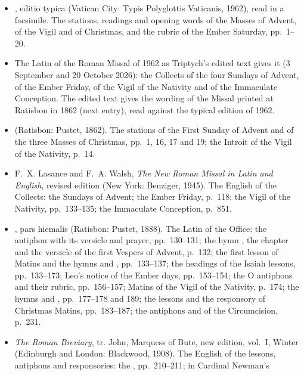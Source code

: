 \begin{itemize}[leftmargin=1.3em, itemsep=0.3em]
\item {}, editio typica (Vatican City: Typis Polyglottis Vaticanis, 1962),
read in a facsimile. The stations, readings and opening words of the Masses of Advent, of the
Vigil and of Christmas, and the rubric of the Ember Saturday, pp.~1--20.
\item The Latin of the Roman Missal of 1962 as Triptych's edited text gives it (3 September and
20 October 2026): the Collects of the four Sundays of Advent, of the Ember Friday, of the Vigil of
the Nativity and of the Immaculate Conception. The edited text gives the wording of the Missal
printed at Ratisbon in 1862 (next entry), read against the typical edition of 1962.
\item {} (Ratisbon: Pustet, 1862). The stations of the First Sunday of
Advent and of the three Masses of Christmas, pp.~1, 16, 17 and 19; the Introit of the Vigil of the
Nativity, p.~14.
\item F.~X. Lasance and F.~A. Walsh, \textit{The New Roman Missal in Latin and English}, revised
edition (New York: Benziger, 1945). The English of the Collects: the Sundays of Advent; the Ember
Friday, p.~118; the Vigil of the Nativity, pp.~133--135; the Immaculate Conception, p.~851.
\item {}, pars hiemalis (Ratisbon: Pustet, 1888). The Latin of the Office:
the antiphon  with its versicle and prayer, pp.~130--131; the hymn
, the chapter and the versicle  of the first Vespers of
Advent, p.~132; the first lesson of Matins and the hymns  and
, pp.~133--137; the headings of the Isaiah lessons, pp.~133--173;
Leo's notice of the Ember days, pp.~153--154; the O antiphons and their rubric, pp.~156--157;
Matins of the Vigil of the Nativity, p.~174; the hymns  and
, pp.~177--178 and 189; the lessons and the responsory  of Christmas Matins, pp.~183--187; the antiphons  and
 of the Circumcision, p.~231.
\item \textit{The Roman Breviary}, tr. John, Marquess of Bute, new edition, vol.~I, Winter
(Edinburgh and London: Blackwood, 1908). The English of the lessons, antiphons and responsories:
the , pp.~210--211;  in Cardinal Newman's

\end{itemize}
